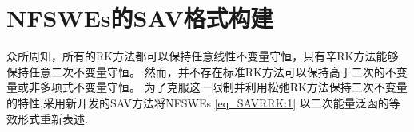 
\section{NFSWEs的SAV格式构建}\label{Section_SAVRRK: 2}

众所周知，所有的RK方法都可以保持任意线性不变量守恒，只有辛RK方法能够保持任意二次不变量守恒。
然而，并不存在标准RK方法可以保持高于二次的不变量或非多项式不变量守恒。
为了克服这一限制并利用松弛RK方法保持二次不变量的特性,采用新开发的SAV方法将NFSWEs \eqref{eq_SAVRRK:1} 以二次能量泛函的等效形式重新表述.

